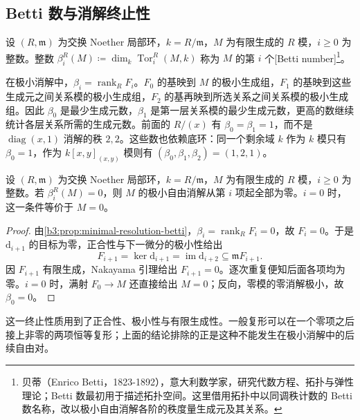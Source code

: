 \subsection{Betti 数与消解终止性}
\label{b3:subsec:1701:03}

\begin{definition}\label{b3:def:local-betti-numbers}
	设 \((R,\mathfrak m)\) 为交换 Noether 局部环，\(k=R/\mathfrak m\)，\(M\) 为有限生成的 \(R\) 模，\(i\ge0\) 为整数。整数 \(\beta_i^R(M)\coloneqq\dim_k\operatorname{Tor}_i^R(M,k)\) 称为 \(M\) 的第 \(i\) 个[Betti number]\footnote{贝蒂（Enrico Betti，1823-1892），意大利数学家，研究代数方程、拓扑与弹性理论；Betti 数最初用于描述拓扑空间。这里借用拓扑中以同调秩计数的 Betti 数名称，改以极小自由消解各阶的秩度量生成元及其关系。}。
\end{definition}

在极小消解中，\(\beta_i=\operatorname{rank}_RF_i\)。\(F_0\) 的基映到 \(M\) 的极小生成组，\(F_1\) 的基映到这些生成元之间关系模的极小生成组，\(F_2\) 的基再映到所选关系之间关系模的极小生成组。因此 \(\beta_0\) 是最少生成元数，\(\beta_1\) 是第一层关系模的最少生成元数，更高的数继续统计各层关系所需的生成元数。前面的 \(R/(x)\) 有 \(\beta_0=\beta_1=1\)，而不是 \(\operatorname{diag}(x,1)\) 消解的秩 \(2,2\)。这些数也依赖底环：同一个剩余域 \(k\) 作为 \(k\) 模只有 \(\beta_0=1\)，作为 \(k[x,y]_{(x,y)}\) 模则有 \((\beta_0,\beta_1,\beta_2)=(1,2,1)\)。

\begin{corollary}\label{b3:cor:betti-gap-termination}
	设 \((R,\mathfrak m)\) 为交换 Noether 局部环，\(k=R/\mathfrak m\)，\(M\) 为有限生成的 \(R\) 模，\(i\ge0\) 为整数。若 \(\beta_i^R(M)=0\)，则 \(M\) 的极小自由消解从第 \(i\) 项起全部为零。\(i=0\) 时，这一条件等价于 \(M=0\)。
\end{corollary}
\begin{proof}
	由\cref{b3:prop:minimal-resolution-betti}，\(\beta_i=\operatorname{rank}_RF_i=0\)，故 \(F_i=0\)。于是 \(\mathrm{d}_{i+1}\) 的目标为零，正合性与下一微分的极小性给出
	\[
		F_{i+1}=\ker\mathrm{d}_{i+1} =\operatorname{im}\mathrm{d}_{i+2}\subseteq\mathfrak mF_{i+1}.
	\]
	因 \(F_{i+1}\) 有限生成，Nakayama 引理给出 \(F_{i+1}=0\)。逐次重复便知后面各项均为零。\(i=0\) 时，满射 \(F_0\to M\) 还直接给出 \(M=0\)；反向，零模的零消解极小，故 \(\beta_0=0\)。
\end{proof}

这一终止性质用到了正合性、极小性与有限生成性。一般复形可以在一个零项之后接上非零的两项恒等复形；上面的结论排除的正是这种不能发生在极小消解中的后续自由对。

